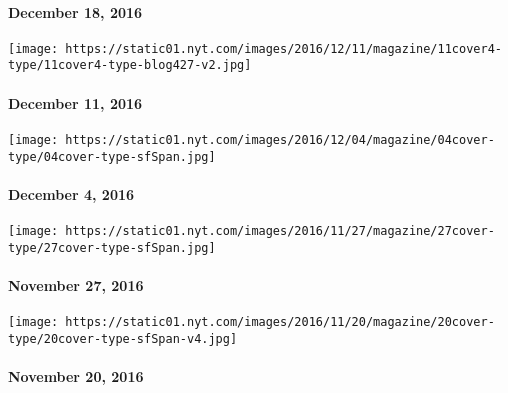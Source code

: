 \hypertarget{december-18-2016}{%
\paragraph{December 18, 2016}\label{december-18-2016}}

\href{http://www.nytimes.com/indexes/2016/12/11/magazine/index.html}{}

\texttt{[image: https://static01.nyt.com/images/2016/12/11/magazine/11cover4-type/11cover4-type-blog427-v2.jpg]}

\hypertarget{december-11-2016}{%
\paragraph{December 11, 2016}\label{december-11-2016}}

\href{http://www.nytimes.com/indexes/2016/12/04/magazine/index.html}{}

\texttt{[image: https://static01.nyt.com/images/2016/12/04/magazine/04cover-type/04cover-type-sfSpan.jpg]}

\hypertarget{december-4-2016}{%
\paragraph{December 4, 2016}\label{december-4-2016}}

\href{http://www.nytimes.com/indexes/2016/11/27/magazine/index.html}{}

\texttt{[image: https://static01.nyt.com/images/2016/11/27/magazine/27cover-type/27cover-type-sfSpan.jpg]}

\hypertarget{november-27-2016}{%
\paragraph{November 27, 2016}\label{november-27-2016}}

\href{http://www.nytimes.com/indexes/2016/11/20/magazine/index.html}{}

\texttt{[image: https://static01.nyt.com/images/2016/11/20/magazine/20cover-type/20cover-type-sfSpan-v4.jpg]}

\hypertarget{november-20-2016}{%
\paragraph{November 20, 2016}\label{november-20-2016}}

\href{http://www.nytimes.com/indexes/2016/11/13/magazine/index.html}{}

